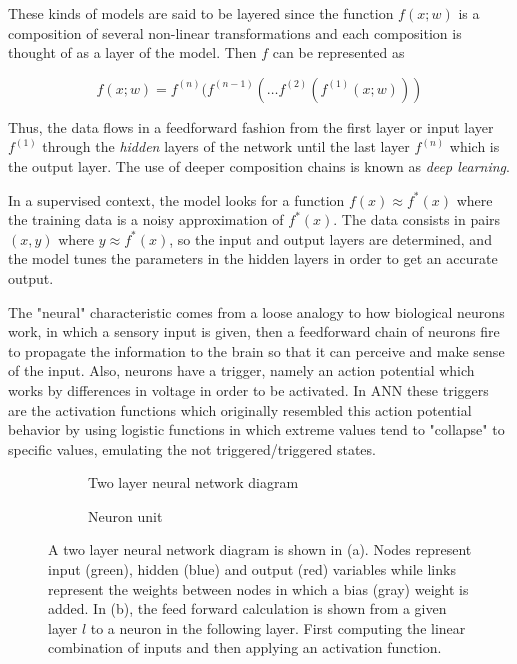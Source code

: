 These kinds of models are said to be layered since the function $f(x; w)$ is a composition of several non-linear transformations and each composition is thought of as a layer of the model. Then $f$ can be represented as 

\begin{equation}
    f(x;w) = f^{(n)}(f^{(n-1)}(\ldots f^{(2)} (f^{(1)}(x;w)))
    \label{eq:layers}
\end{equation} 

Thus, the data flows in a feedforward fashion from the first layer or input layer $f^{(1)}$ through the \textit{hidden} layers of the network until the last layer $f^{(n)}$ which is the output layer. The use of deeper composition chains is known as \textit{deep learning}.

In a supervised context, the model looks for a function $f(x) \approx f^*(x)$ where the training data is a noisy approximation of $f^*(x)$. The data consists in pairs $(x, y)$ where $y \approx f^*(x)$, so the input and output layers are determined, and the model tunes the parameters in the hidden layers in order to get an accurate output.

The "neural" characteristic comes from a loose analogy to how biological neurons work, in which a sensory input is given, then a feedforward chain of neurons fire to propagate the information to the brain so that it can perceive and make sense of the input. Also, neurons have a trigger, namely an action potential which works by differences in voltage in order to be activated. In ANN these triggers are the activation functions which originally resembled this action potential behavior by using logistic functions in which extreme values tend to "collapse" to specific values, emulating the not triggered/triggered states.


\begin{figure}
  \begin{subfigure}[b]{0.4\textwidth}
    
    \caption{Two layer neural network diagram}
    \label{fig:ann}
  \end{subfigure}
\hfill
  \begin{subfigure}[b]{0.4\textwidth}
    
    \caption{Neuron unit}
    \label{fig:feed_forward}
  \end{subfigure}
  \caption[Illustration of a two layer fully connected neural network (a) and a neuron unit (b)]{A two layer neural network diagram is shown in (a). Nodes represent input (green), hidden (blue) and output (red) variables while links represent the weights between nodes in which a bias (gray) weight is added. In (b), the feed forward calculation is shown from a given layer $l$ to a neuron in the following layer. First computing the linear combination of inputs and then applying an activation function. }
\end{figure}



